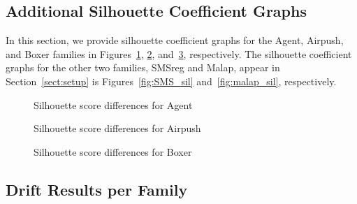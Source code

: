 \documentclass[12pt]{article}
\begin{document}
\subsection{Additional Silhouette Coefficient Graphs}

In this section, we provide silhouette coefficient graphs for the Agent, Airpush, and Boxer families
in Figures~\ref{fig:agent_sil}, \ref{fig:airpush_sil}, and~\ref{fig:boxer_sil}, respectively.
The silhouette coefficient graphs for the other two families, SMSreg and Malap,
appear in Section~\ref{sect:setup} is Figures~\ref{fig:SMS_sil} and~\ref{fig:malap_sil}, respectively.

%
%


\begin{figure}[!htb]
    \centering
    
    \caption{Silhouette score differences for Agent}\label{fig:agent_sil}
\end{figure}

\begin{figure}[!htb]
    \centering
    
    \caption{Silhouette score differences for Airpush}\label{fig:airpush_sil}
\end{figure}

\begin{figure}[!htb]
    \centering
    
    \caption{Silhouette score differences for Boxer}\label{fig:boxer_sil}
\end{figure}

\clearpage

\subsection{Drift Results per Family}
\end{document}

